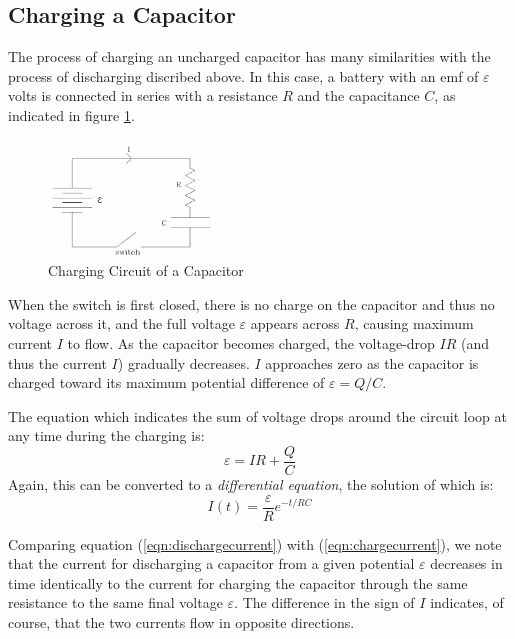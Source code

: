 \subsection{Charging a Capacitor}

The process of charging an uncharged capacitor has many similarities with the process of discharging discribed above. In this case, a battery with an emf of $\varepsilon$ volts is connected in series with a resistance $R$ and the capacitance $C$, as indicated in figure \ref{fig:chargecircuit}.

\begin{figure}[h]
    \begin{center}
        \includegraphics[width=0.4\textwidth]{./Exp4/pic/image3.png}
    \end{center}
    \caption{Charging Circuit of a Capacitor}
    \label{fig:chargecircuit}
\end{figure}

When the switch is first closed, there is no charge on the capacitor and thus no voltage across it, and the full voltage $\varepsilon$ appears across $R$, causing maximum current $I$ to flow. As the capacitor becomes charged, the voltage-drop $IR$ (and thus the current $I$) gradually decreases. $I$ approaches zero as the capacitor is charged toward its maximum potential difference of $\varepsilon = Q/C$. \myskip

The equation which indicates the sum of voltage drops around the circuit loop at any time during the charging is:
\begin{equation}
    \varepsilon = IR + \frac{Q}{C}
\end{equation}
Again, this can be converted to a \emph{differential equation}, the solution of which is:
\begin{equation}
    I(t) = \frac{\varepsilon}{R}e^{-t/RC}
    \label{eqn:chargecurrent}
\end{equation}

Comparing equation (\ref{eqn:dischargecurrent}) with (\ref{eqn:chargecurrent}), we note that the current for discharging a capacitor from a given potential $\varepsilon$ decreases in time identically to the current for charging the capacitor through the same resistance to the same final voltage $\varepsilon$. The difference in the sign of $I$ indicates, of course, that the two currents flow in opposite directions.

